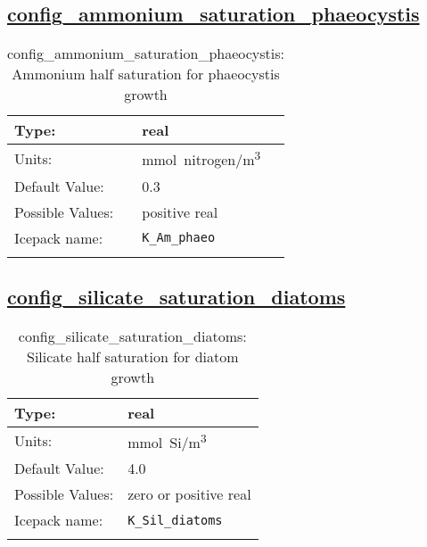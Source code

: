 \subsection[config\_ammonium\_saturation\_phaeocystis]{\hyperref[sec:nm_tab_biogeochemistry]{config\_ammonium\_saturation\_phaeocystis}}
\label{subsec:nm_sec_config_ammonium_saturation_phaeocystis}
\begin{center}
\begin{longtable}{| p{2.0in} || p{4.0in} |}
    \hline
    Type: & real \\
    \hline
    Units: & \si{mmol.nitrogen/m^3} \\
    \hline
    Default Value: & 0.3 \\
    \hline
    Possible Values: & positive real \\
    \hline
    Icepack name: & \verb+K_Am_phaeo+ \\
    \hline
    \caption{config\_ammonium\_saturation\_phaeocystis: Ammonium half saturation for phaeocystis growth}
\end{longtable}
\end{center}
\subsection[config\_silicate\_saturation\_diatoms]{\hyperref[sec:nm_tab_biogeochemistry]{config\_silicate\_saturation\_diatoms}}
\label{subsec:nm_sec_config_silicate_saturation_diatoms}
\begin{center}
\begin{longtable}{| p{2.0in} || p{4.0in} |}
    \hline
    Type: & real \\
    \hline
    Units: & \si{mmol.Si/m^3} \\
    \hline
    Default Value: & 4.0 \\
    \hline
    Possible Values: & zero or positive real \\
    \hline
    Icepack name: & \verb+K_Sil_diatoms+ \\
    \hline
    \caption{config\_silicate\_saturation\_diatoms: Silicate half saturation for diatom growth}
\end{longtable}
\end{center}
